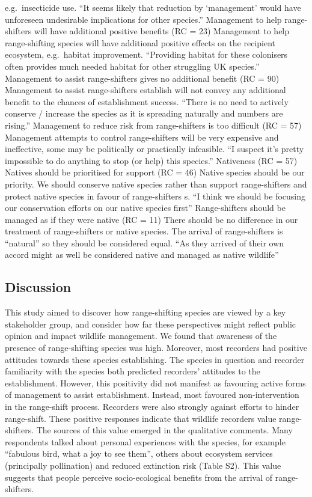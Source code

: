 \documentclass[
]{article}
\begin{document}
e.g.~insecticide use. ``It seems likely that reduction by `management'
would have unforeseen undesirable implications for other species.''
Management to help range-shifters will have additional positive benefits
(RC = 23) Management to help range-shifting species will have additional
positive effects on the recipient ecosystem, e.g.~habitat improvement.
``Providing habitat for these colonisers often provides much needed
habitat for other struggling UK species.'' Management to assist
range-shifters gives no additional benefit (RC = 90) Management to
assist range-shifters establish will not convey any additional benefit
to the chances of establishment success. ``There is no need to actively
conserve / increase the species as it is spreading naturally and numbers
are rising.'' Management to reduce risk from range-shifters is too
difficult (RC = 57) Management attempts to control range-shifters will
be very expensive and ineffective, some may be politically or
practically infeasible. ``I suspect it's pretty impossible to do
anything to stop (or help) this species.'' Nativeness (RC = 57) Natives
should be prioritised for support (RC = 46) Native species should be our
priority. We should conserve native species rather than support
range-shifters and protect native species in favour of range-shifters s.
``I think we should be focusing our conservation efforts on our native
species first'' Range-shifters should be managed as if they were native
(RC = 11) There should be no difference in our treatment of
range-shifters or native species. The arrival of range-shifters is
``natural'' so they should be considered equal. ``As they arrived of
their own accord might as well be considered native and managed as
native wildlife''

\hypertarget{discussion}{%
\subsection{Discussion}\label{discussion}}

This study aimed to discover how range-shifting species are viewed by a
key stakeholder group, and consider how far these perspectives might
reflect public opinion and impact wildlife management. We found that
awareness of the presence of range-shifting species was high. Moreover,
most recorders had positive attitudes towards these species
establishing. The species in question and recorder familiarity with the
species both predicted recorders' attitudes to the establishment.
However, this positivity did not manifest as favouring active forms of
management to assist establishment. Instead, most favoured
non-intervention in the range-shift process. Recorders were also
strongly against efforts to hinder range-shift. These positive responses
indicate that wildlife recorders value range-shifters. The sources of
this value emerged in the qualitative comments. Many respondents talked
about personal experiences with the species, for example ``fabulous
bird, what a joy to see them'', others about ecosystem services
(principally pollination) and reduced extinction risk (Table S2). This
value suggests that people perceive socio-ecological benefits from the
arrival of range-shifters.
\end{document}
